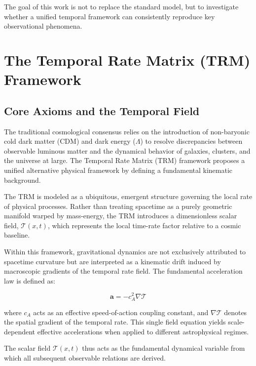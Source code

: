 \documentclass[11pt]{article}
\begin{document}
	The goal of this work is not to replace the standard model, but to investigate whether a unified temporal framework can consistently reproduce key observational phenomena.

\section{The Temporal Rate Matrix (TRM) Framework}

\subsection{Core Axioms and the Temporal Field}

The traditional cosmological consensus relies on the introduction of non-baryonic cold dark matter (CDM) and dark energy ($\Lambda$) to resolve discrepancies between observable luminous matter and the dynamical behavior of galaxies, clusters, and the universe at large. The Temporal Rate Matrix (TRM) framework proposes a unified alternative physical framework by defining a fundamental kinematic background.

The TRM is modeled as a ubiquitous, emergent structure governing the local rate of physical processes. Rather than treating spacetime as a purely geometric manifold warped by mass-energy, the TRM introduces a dimensionless scalar field, $\mathcal{T}(x,t)$, which represents the local time-rate factor relative to a cosmic baseline.

Within this framework, gravitational dynamics are not exclusively attributed to spacetime curvature but are interpreted as a kinematic drift induced by macroscopic gradients of the temporal rate field. The fundamental acceleration law is defined as:

\begin{equation}
	\bm{a} = -c_A^2 \nabla \mathcal{T}
\end{equation}

where $c_A$ acts as an effective speed-of-action coupling constant, and $\nabla \mathcal{T}$ denotes the spatial gradient of the temporal rate. This single field equation yields scale-dependent effective accelerations when applied to different astrophysical regimes.

The scalar field $\mathcal{T}(x,t)$ thus acts as the fundamental dynamical variable from which all subsequent observable relations are derived.

\end{document}
